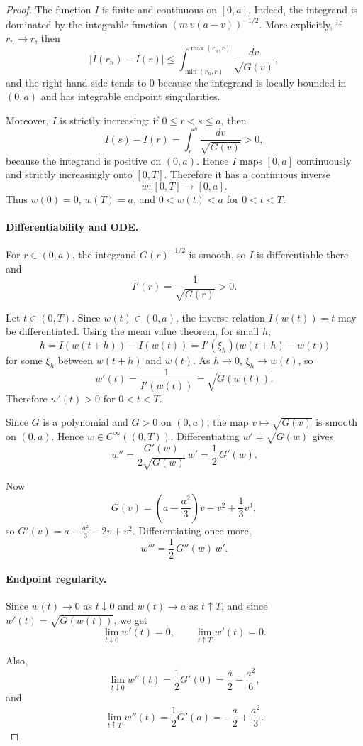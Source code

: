 \documentclass{article}
\begin{document}
\begin{proof}
The function $I$ is finite and continuous on $[0,a]$. Indeed, the integrand is dominated by the integrable function $(m\,v(a-v))^{-1/2}$. More explicitly, if $r_n \to r$, then
\[
|I(r_n) - I(r)| \le \int_{\min(r_n,r)}^{\max(r_n,r)} \frac{dv}{\sqrt{G(v)}},
\]
and the right-hand side tends to $0$ because the integrand is locally bounded in $(0,a)$ and has integrable endpoint singularities.

Moreover, $I$ is strictly increasing: if $0 \le r < s \le a$, then
\[
I(s) - I(r) = \int_r^s \frac{dv}{\sqrt{G(v)}} > 0,
\]
because the integrand is positive on $(0,a)$. Hence $I$ maps $[0,a]$ continuously and strictly increasingly onto $[0,T]$. Therefore it has a continuous inverse
\[
w : [0,T] \to [0,a].
\]
Thus $w(0) = 0$, $w(T) = a$, and $0 < w(t) < a$ for $0 < t < T$.

\paragraph{Differentiability and ODE.}
For $r \in (0,a)$, the integrand $G(r)^{-1/2}$ is smooth, so $I$ is differentiable there and
\[
I'(r) = \frac{1}{\sqrt{G(r)}} > 0.
\]

Let $t \in (0,T)$. Since $w(t) \in (0,a)$, the inverse relation $I(w(t)) = t$ may be differentiated. Using the mean value theorem, for small $h$,
\[
h = I(w(t+h)) - I(w(t)) = I'(\xi_h)\bigl(w(t+h) - w(t)\bigr)
\]
for some $\xi_h$ between $w(t+h)$ and $w(t)$. As $h \to 0$, $\xi_h \to w(t)$, so
\[
w'(t) = \frac{1}{I'(w(t))} = \sqrt{G(w(t))}.
\]
Therefore $w'(t) > 0$ for $0 < t < T$.

Since $G$ is a polynomial and $G > 0$ on $(0,a)$, the map $v \mapsto \sqrt{G(v)}$ is smooth on $(0,a)$. Hence $w \in C^\infty((0,T))$. Differentiating $w' = \sqrt{G(w)}$ gives
\[
w'' = \frac{G'(w)}{2\sqrt{G(w)}}\,w' = \frac{1}{2}\,G'(w).
\]

Now
\[
G(v) = \left(a - \frac{a^2}{3}\right)v - v^2 + \frac{1}{3}v^3,
\]
so $G'(v) = a - \frac{a^2}{3} - 2v + v^2$. Differentiating once more,
\[
w''' = \frac{1}{2}\,G''(w)\,w'.
\]

\paragraph{Endpoint regularity.}
Since $w(t) \to 0$ as $t \downarrow 0$ and $w(t) \to a$ as $t \uparrow T$, and since $w'(t) = \sqrt{G(w(t))}$, we get
\[
\lim_{t \downarrow 0} w'(t) = 0, \qquad \lim_{t \uparrow T} w'(t) = 0.
\]

Also,
\[
\lim_{t \downarrow 0} w''(t) = \frac{1}{2}G'(0) = \frac{a}{2} - \frac{a^2}{6},
\]
and
\[
\lim_{t \uparrow T} w''(t) = \frac{1}{2}G'(a) = -\frac{a}{2} + \frac{a^2}{3}.
\]


\end{proof}
\end{document}
